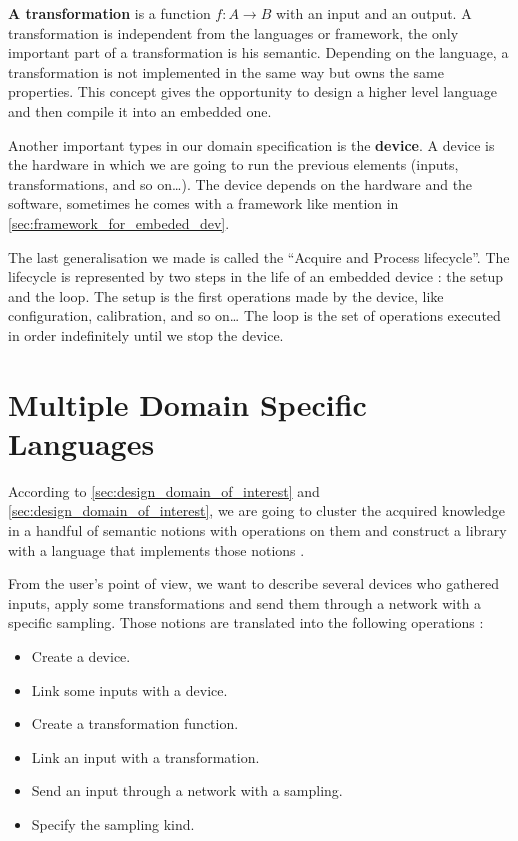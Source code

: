 \textbf{A transformation} is a function $f : A \rightarrow B$ with an input
and an output. A transformation is independent from the languages or framework,
the only important part of a transformation is his semantic. Depending on the
language, a transformation is not implemented in the same way but owns the same
properties. This concept gives the opportunity to design a higher level
language and then compile it into an embedded one.

Another important types in our domain specification is the \textbf{device}. A
device is the hardware in which we are going to run the previous elements
(inputs, transformations, and so on…). The device depends on the hardware and
the software, sometimes he comes with a framework like mention
in \ref{sec:framework_for_embeded_dev}.

The last generalisation we made is called the ``Acquire and Process lifecycle''.
The lifecycle is represented by two steps in the life of an embedded device : the
setup and the loop. The setup is the first operations made by the device, like
configuration, calibration, and so on… The loop is the set of operations
executed in order indefinitely until we stop the device.

\section{Multiple Domain Specific Languages}
\label{sec:multiple_dsl}

According to \ref{sec:design_domain_of_interest} and
\ref{sec:design_domain_of_interest}, we are going to cluster the acquired
knowledge in a handful of semantic notions with operations on them and construct
a library with a language that implements those notions
\cite{little_languages_little_maintenance}.

From the user’s point of view, we want to describe several devices who gathered
inputs, apply some transformations and send them through a network with a
specific sampling. Those notions are translated into the following operations :

\begin{itemize}
\item Create a device.
\item Link some inputs with a device.
\item Create a transformation function.
\item Link an input with a transformation.
\item Send an input through a network with a sampling.
\item Specify the sampling kind.
\end{itemize}

